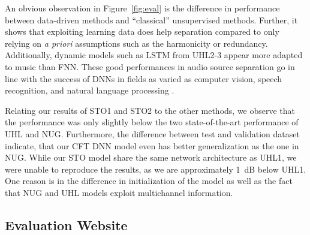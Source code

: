 An obvious observation in Figure~\ref{fig:eval} is the difference in performance between data-driven methods and ``classical'' unsupervised methods. 
Further, it shows that exploiting learning data does help separation compared to only relying on \textit{a priori} assumptions such as the harmonicity or redundancy. Additionally, dynamic models such as LSTM from UHL2-3 appear more adapted to music than FNN. 
These good performances in audio source separation go in line with the success of DNNs in fields as varied as computer vision, speech recognition, and natural language processing \cite{lecun15}.
\par
Relating our results of STO1 and STO2 to the other methods, we observe that the performance was only slightly below the two state-of-the-art performance of UHL and NUG.
Furthermore, the difference between test and validation dataset indicate, that our CFT DNN model even has better generalization as the one in NUG. 
While our STO model share the same network architecture as UHL1, we were unable to reproduce the results, as we are approximately 1~dB below UHL1.
One reason is in the difference in initialization of the model as well as the fact that NUG and UHL models exploit multichannel information. 

\subsection{Evaluation Website}
\label{ssec:evaluation Website}

